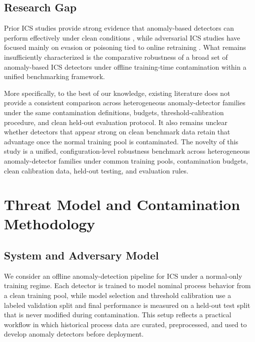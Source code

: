 \documentclass[10pt,conference]{IEEEtran}
\begin{document}
\subsection{Research Gap}

Prior ICS studies provide strong evidence that anomaly-based detectors can perform effectively under clean conditions \cite{goh2017rnn,kravchik2018cnn,inoue2017unsupervised,kim2020seq2seq,kravchik2022lightweight,gomez2020madics}, while adversarial ICS studies have focused mainly on evasion or poisoning tied to online retraining \cite{zizzo2020adversarial,10.1145/3427228.3427660,anthi2021adversarial,kravchik2021poisoning,kravchik2022practical}. What remains insufficiently characterized is the comparative robustness of a broad set of anomaly-based ICS detectors under offline training-time contamination within a unified benchmarking framework.

More specifically, to the best of our knowledge, existing literature does not provide a consistent comparison across heterogeneous anomaly-detector families under the same contamination definitions, budgets, threshold-calibration procedure, and clean held-out evaluation protocol. It also remains unclear whether detectors that appear strong on clean benchmark data retain that advantage once the normal training pool is contaminated. The novelty of this study is a unified, configuration-level robustness benchmark across heterogeneous anomaly-detector families under common training pools, contamination budgets, clean calibration data, held-out testing, and evaluation rules.

\section{Threat Model and Contamination Methodology}

\subsection{System and Adversary Model}

We consider an offline anomaly-detection pipeline for ICS under a normal-only training regime. Each detector is trained to model nominal process behavior from a clean training pool, while model selection and threshold calibration use a labeled validation split and final performance is measured on a held-out test split that is never modified during contamination. This setup reflects a practical workflow in which historical process data are curated, preprocessed, and used to develop anomaly detectors before deployment.
\end{document}
